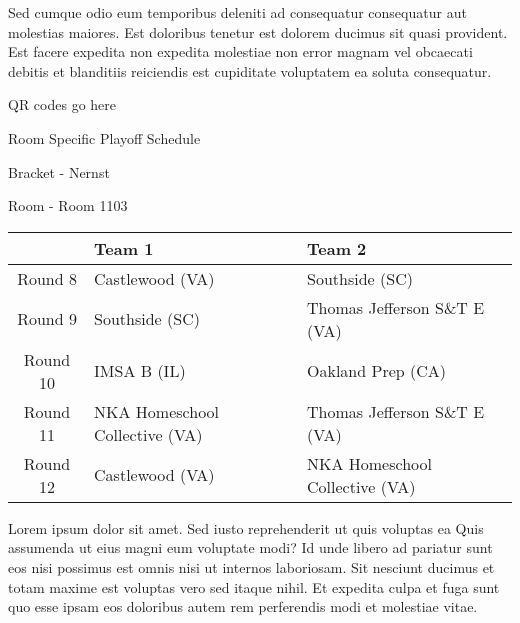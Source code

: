 \documentclass{article}%
\begin{document}
\newline%
Sed cumque odio eum temporibus deleniti ad consequatur consequatur aut molestias maiores. Est doloribus tenetur est dolorem ducimus sit quasi provident. Est facere expedita non expedita molestiae non error magnam vel obcaecati debitis et blanditiis reiciendis est cupiditate voluptatem ea soluta consequatur.%
\vspace*{140pt}%
\begin{center}%
\begin{Huge}%
QR codes go here%
\end{Huge}%
\end{center}%
\newpage%
\begin{center}%
\begin{Huge}%
Room Specific Playoff Schedule%
\end{Huge}%
\vspace*{8pt}%
\linebreak%
\begin{Large}%
Bracket {-} Nernst%
\end{Large}%
\vspace*{8pt}%
\linebreak%
\vspace*{8pt}%
\begin{Large}%
Room {-} Room 1103%
\end{Large}%
\end{center}%
%
\begin{tabularx}{\textwidth}{|c|Y|Y|}%
\hline%
&Team 1&Team 2\\%
\hline%
Round 8&Castlewood (VA)&Southside (SC)\\%
Round 9&Southside (SC)&Thomas Jefferson S\&T E (VA)\\%
Round 10&IMSA B (IL)&Oakland Prep (CA)\\%
Round 11&NKA Homeschool Collective (VA)&Thomas Jefferson S\&T E (VA)\\%
Round 12&Castlewood (VA)&NKA Homeschool Collective (VA)\\%
\hline%
\end{tabularx}%
\vspace*{8pt}%
\newline%
Lorem ipsum dolor sit amet. Sed iusto reprehenderit ut quis voluptas ea Quis assumenda ut eius magni eum voluptate modi? Id unde libero ad pariatur sunt eos nisi possimus est omnis nisi ut internos laboriosam. Sit nesciunt ducimus et totam maxime est voluptas vero sed itaque nihil. Et expedita culpa et fuga sunt quo esse ipsam eos doloribus autem rem perferendis modi et molestiae vitae.\newline%
\end{document}
